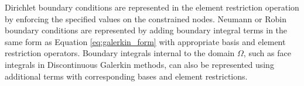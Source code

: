Dirichlet boundary conditions are represented in the element restriction operation by enforcing the specified values on the constrained nodes.
Neumann or Robin boundary conditions are represented by adding boundary integral terms in the same form as Equation \ref{eq:galerkin_form} with appropriate basis and element restriction operators.
Boundary integrals internal to the domain $\Omega$, such as face integrals in Discontinuous Galerkin methods, can also be represented using additional terms with corresponding bases and element restrictions.